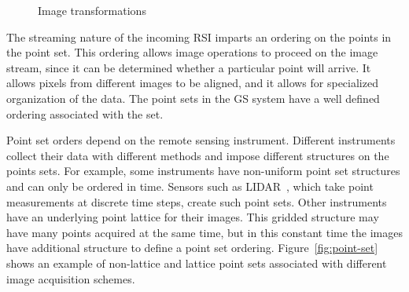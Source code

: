 \documentclass{ucdthesis}       %
\begin{document}
\begin{figure}[htb]
  \caption{Image transformations}
  \label{fig:transformation}
\end{figure}

The streaming nature of the incoming \ac{RSI} imparts an ordering on
the points in the point set.  This ordering allows image operations to
proceed on the image stream, since it can be determined whether a
particular point will arrive.  It allows pixels from different images
to be aligned, and it allows for specialized organization of the data.
The point sets in the \ac{GS} system have a well defined ordering
associated with the set.

Point set orders depend on the remote sensing instrument. Different
instruments collect their data with different methods and impose
different structures on the points sets. For example, some instruments
have non-uniform point set structures and can only be ordered in time.
Sensors such as \ac{LIDAR}~\cite{kavaya99lidar-tutor}, which take
point measurements at discrete time steps, create such point sets.
Other instruments have an underlying point lattice for their images.
This gridded structure may have many points acquired at the same time,
but in this constant time the images have additional structure to
define a point set ordering.  Figure~\ref{fig:point-set} shows an
example of non-lattice and lattice point sets associated with
different image acquisition schemes.
\end{document}
